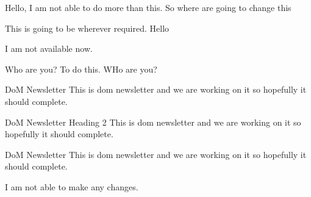 \documentclass{article}
\begin{document}
Hello, I am not able to do more than this. So where are going to change this

This is going to be wherever required. Hello

I am not available now.

Who are you? To do this. WHo are you?

DoM Newsletter
This is dom newsletter  and we are working on it so hopefully it should complete.

DoM Newsletter Heading 2
This is dom newsletter  and we are working on it so hopefully it should complete.

DoM Newsletter
This is dom newsletter  and we are working on it so hopefully it should complete.

I am not able to make any changes.
\end{document}
